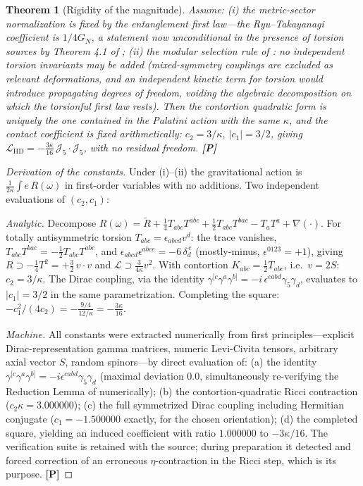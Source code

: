 \documentclass[11pt]{article}
\newtheorem{theorem}{Theorem}[section]
\theoremstyle{definition}
\newcommand{\pP}{\textbf{[P]}}
\begin{document}
\begin{theorem}[Rigidity of the magnitude]
\label{thm:rigidity}
Assume: (i) the metric-sector normalization is fixed by the entanglement
first law---the Ryu--Takayanagi coefficient is $1/4G_N$, a statement now
unconditional in the presence of torsion sources by Theorem 4.1 of
\cite{McGwier2026d}; (ii) the modular selection rule of
\cite{McGwier2026b}: no independent torsion invariants may be added
(mixed-symmetry couplings are excluded as relevant deformations, and an
independent kinetic term for torsion would introduce propagating degrees
of freedom, voiding the algebraic decomposition on which the torsionful
first law rests). Then the contortion quadratic form is uniquely the one
contained in the Palatini action with the \emph{same} $\kappa$, and the
contact coefficient is fixed arithmetically:
$c_2=3/\kappa$, $|c_1|=3/2$, giving
$\mathcal L_{\mathrm{HD}}=-\tfrac{3\kappa}{16}\,
\mathcal J_5\!\cdot\!\mathcal J_5$, with no residual freedom. \pP{}
\end{theorem}

\begin{proof}[Derivation of the constants]
Under (i)--(ii) the gravitational action is
$\tfrac{1}{2\kappa}\int e\,R(\omega)$ in first-order variables with no
additions. Two independent evaluations of $(c_2,c_1)$:

\emph{Analytic.} Decompose $R(\omega)=\tilde R+\tfrac14 T_{abc}T^{abc}
+\tfrac12 T_{abc}T^{bac}-T_aT^a+\nabla(\cdot)$. For totally antisymmetric
torsion $T_{abc}=\epsilon_{abcd}v^d$: the trace vanishes,
$T_{abc}T^{bac}=-\tfrac12T_{abc}T^{abc}$, and
$\epsilon_{abcd}\epsilon^{abce}=-6\,\delta_d^{\,e}$ (mostly-minus,
$\epsilon^{0123}=+1$), giving
$R\supset-\tfrac14T^2=+\tfrac32\,v\!\cdot\!v$ and
$\mathcal L\supset\tfrac{3}{4\kappa}v^2$. With contortion
$K_{abc}=\tfrac12T_{abc}$, i.e.\ $v=2S$:
$c_2=3/\kappa$. The Dirac coupling, via the identity
$\gamma^{[c}\gamma^a\gamma^{b]}=-i\,\epsilon^{cabd}\gamma_5\gamma_d$,
evaluates to $|c_1|=3/2$ in the same parametrization. Completing the
square: $-c_1^2/(4c_2)=-\tfrac{9/4}{12/\kappa}=-\tfrac{3\kappa}{16}$.

\emph{Machine.} All constants were extracted numerically from first
principles---explicit Dirac-representation gamma matrices, numeric
Levi-Civita tensors, arbitrary axial vector $S$, random spinors---by
direct evaluation of: (a) the identity
$\gamma^{[c}\gamma^a\gamma^{b]}=-i\epsilon^{cabd}\gamma_5\gamma_d$
(maximal deviation $0.0$, simultaneously re-verifying the Reduction
Lemma of \cite{McGwier2026b} numerically); (b) the contortion-quadratic
Ricci contraction ($c_2\kappa=3.000000$); (c) the full symmetrized Dirac
coupling including Hermitian conjugate ($c_1=-1.500000$ exactly, for the
chosen orientation); (d) the completed square, yielding an induced
coefficient with ratio $1.000000$ to $-3\kappa/16$. The verification
suite is retained with the source; during preparation it detected and
forced correction of an erroneous $\eta$-contraction in the Ricci step,
which is its purpose. \pP{}
\end{proof}
\end{document}
